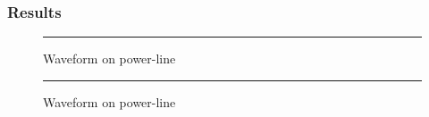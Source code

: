 \subsubsection{Results}
\begin{itemize}

\begin{figure}[h]
  \begin{minipage}[c]{.46\linewidth}
    \centering
    \label{fig:dsp20}
    \rule{16em}{0.5pt}
    \caption[Waveform on power-linel]{Waveform on power-line}
  \end{minipage}
  \hfill%
  \begin{minipage}[c]{.46\linewidth}
  \centering
    \label{fig:dsp50}
    \rule{16em}{0.5pt}
    \caption[Waveform on power-linel]{Waveform on power-line}
  \end{minipage}
\end{figure}


\end{itemize}
